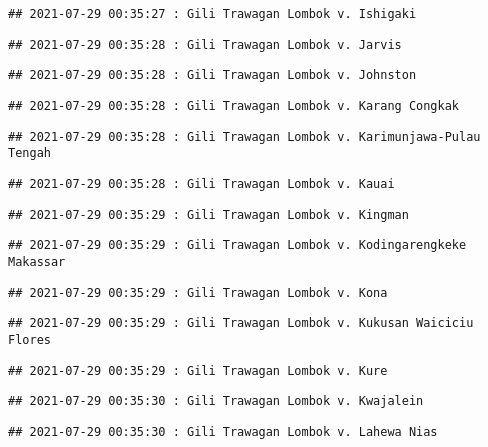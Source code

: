 \documentclass[
]{article}
\begin{document}
\begin{verbatim}
## 2021-07-29 00:35:27 : Gili Trawagan Lombok v. Ishigaki
\end{verbatim}

\begin{verbatim}
## 2021-07-29 00:35:28 : Gili Trawagan Lombok v. Jarvis
\end{verbatim}

\begin{verbatim}
## 2021-07-29 00:35:28 : Gili Trawagan Lombok v. Johnston
\end{verbatim}

\begin{verbatim}
## 2021-07-29 00:35:28 : Gili Trawagan Lombok v. Karang Congkak
\end{verbatim}

\begin{verbatim}
## 2021-07-29 00:35:28 : Gili Trawagan Lombok v. Karimunjawa-Pulau Tengah
\end{verbatim}

\begin{verbatim}
## 2021-07-29 00:35:28 : Gili Trawagan Lombok v. Kauai
\end{verbatim}

\begin{verbatim}
## 2021-07-29 00:35:29 : Gili Trawagan Lombok v. Kingman
\end{verbatim}

\begin{verbatim}
## 2021-07-29 00:35:29 : Gili Trawagan Lombok v. Kodingarengkeke Makassar
\end{verbatim}

\begin{verbatim}
## 2021-07-29 00:35:29 : Gili Trawagan Lombok v. Kona
\end{verbatim}

\begin{verbatim}
## 2021-07-29 00:35:29 : Gili Trawagan Lombok v. Kukusan Waiciciu Flores
\end{verbatim}

\begin{verbatim}
## 2021-07-29 00:35:29 : Gili Trawagan Lombok v. Kure
\end{verbatim}

\begin{verbatim}
## 2021-07-29 00:35:30 : Gili Trawagan Lombok v. Kwajalein
\end{verbatim}

\begin{verbatim}
## 2021-07-29 00:35:30 : Gili Trawagan Lombok v. Lahewa Nias
\end{verbatim}
\end{document}
